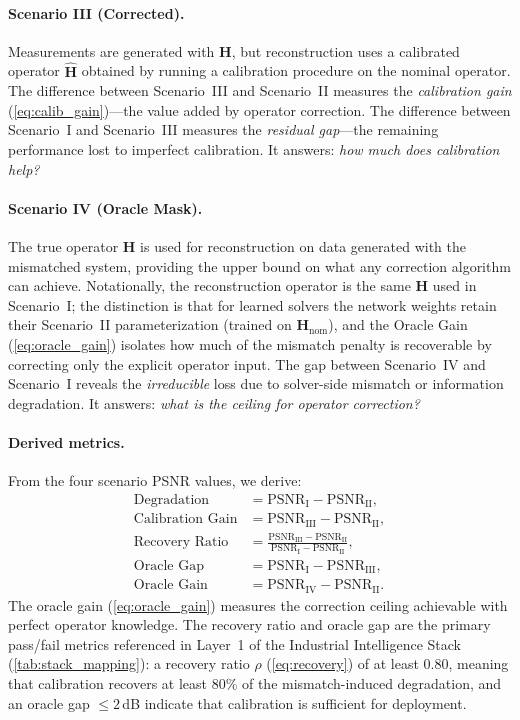 \paragraph{Scenario III (Corrected).}
Measurements are generated with $\mathbf{H}$, but reconstruction uses a
calibrated operator $\hat{\mathbf{H}}$ obtained by running a
calibration procedure on the nominal operator.
The difference between Scenario~III and Scenario~II measures the
\emph{calibration gain} (\cref{eq:calib_gain})---the value added by operator correction.
The difference between Scenario~I and Scenario~III measures the
\emph{residual gap}---the remaining performance lost to imperfect
calibration.
It answers: \emph{how much does calibration help?}

\paragraph{Scenario IV (Oracle Mask).}
The true operator $\mathbf{H}$ is used for
reconstruction on data generated with the mismatched system,
providing the upper bound on what any correction algorithm can achieve.
Notationally, the reconstruction operator is the same $\mathbf{H}$ used in
Scenario~I; the distinction is that for learned solvers the network weights
retain their Scenario~II parameterization (trained on
$\mathbf{H}_{\mathrm{nom}}$), and the Oracle Gain
(\cref{eq:oracle_gain}) isolates how much of the mismatch penalty is
recoverable by correcting only the explicit operator input.
The gap between Scenario~IV and Scenario~I reveals the
\emph{irreducible} loss due to solver-side mismatch or information
degradation.
It answers: \emph{what is the ceiling for operator correction?}

\paragraph{Derived metrics.}
From the four scenario PSNR values, we derive:
\begin{align}
  \text{Degradation}     &= \text{PSNR}_\mathrm{I} - \text{PSNR}_\mathrm{II}, \label{eq:degradation} \\
  \text{Calibration Gain}&= \text{PSNR}_\mathrm{III} - \text{PSNR}_\mathrm{II}, \label{eq:calib_gain} \\
  \text{Recovery Ratio}  &= \frac{\text{PSNR}_\mathrm{III} - \text{PSNR}_\mathrm{II}}{\text{PSNR}_\mathrm{I} - \text{PSNR}_\mathrm{II}}, \label{eq:recovery} \\
  \text{Oracle Gap}      &= \text{PSNR}_\mathrm{I} - \text{PSNR}_\mathrm{III}, \label{eq:oracle_gap} \\
  \text{Oracle Gain}     &= \text{PSNR}_\mathrm{IV} - \text{PSNR}_\mathrm{II}. \label{eq:oracle_gain}
\end{align}
The oracle gain (\cref{eq:oracle_gain}) measures the correction ceiling achievable with perfect operator knowledge.
The recovery ratio and oracle gap are the primary pass/fail metrics
referenced in Layer~1 of the Industrial Intelligence Stack
(\cref{tab:stack_mapping}): a recovery ratio $\rho$ (\cref{eq:recovery}) of at least 0.80, meaning that calibration recovers at least 80\% of the mismatch-induced degradation, and an oracle
gap $\leq 2$\,dB indicate that calibration is sufficient for
deployment.

